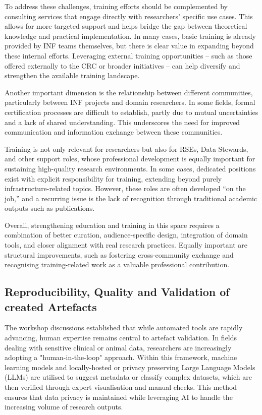 \documentclass{eceasst}
\begin{document}
To address these challenges, training efforts should be complemented by consulting services that engage directly with researchers’ specific use cases.
This allows for more targeted support and helps bridge the gap between theoretical knowledge and practical implementation.
In many cases, basic training is already provided by INF teams themselves, but there is clear value in expanding beyond these internal efforts.
Leveraging external training opportunities -- such as those offered externally to the CRC or broader initiatives -- can help diversify and strengthen the available training landscape.

Another important dimension is the relationship between different communities, particularly between INF projects and domain researchers.
In some fields, formal certification processes are difficult to establish, partly due to mutual uncertainties and a lack of shared understanding.
This underscores the need for improved communication and information exchange between these communities.

Training is not only relevant for researchers but also for RSEs, Data Stewards, and other support roles, whose professional development is equally important for sustaining high-quality research environments.
In some cases, dedicated positions exist with explicit responsibility for training, extending beyond purely infrastructure-related topics.
However, these roles are often developed “on the job,” and a recurring issue is the lack of recognition through traditional academic outputs such as publications.

Overall, strengthening education and training in this space requires a combination of better curation,
audience-specific design, integration of domain tools, and closer alignment with real research practices.
Equally important are structural improvements, such as fostering cross-community exchange and recognising training-related work as a valuable professional contribution.

\subsection{Reproducibility, Quality and Validation of created Artefacts}
The workshop discussions established that while automated tools are rapidly advancing, human expertise remains central to artefact validation.
In fields dealing with sensitive clinical or animal data, researchers are increasingly adopting a "human-in-the-loop" approach.
Within this framework, machine learning models and locally-hosted or privacy preserving Large Language Models (LLMs) are utilised to suggest metadata or classify complex datasets, which are then verified through expert visualisation and manual checks.
This method ensures that data privacy is maintained while leveraging AI to handle the increasing volume of research outputs.
\end{document}

